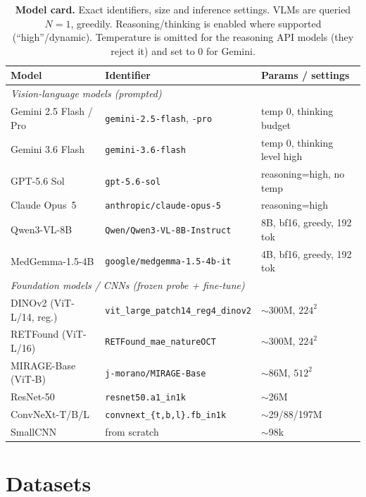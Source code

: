 \begin{table}[t]
  \centering
  \caption{\textbf{Model card.} Exact identifiers, size and inference settings. VLMs are queried $N{=}1$,
  greedily. Reasoning/thinking is enabled where supported (``high''/dynamic). Temperature is omitted for the
  reasoning API models (they reject it) and set to 0 for Gemini.}
  \label{tab:models}
  \small
  \renewcommand{\arraystretch}{0.9}
  \setlength{\tabcolsep}{4pt}
  \begin{tabular}{lll}
    \toprule
    Model & Identifier & Params / settings \\
    \midrule
    \multicolumn{3}{l}{\textit{Vision-language models (prompted)}} \\
    \midrule
    Gemini 2.5 Flash / Pro & \texttt{gemini-2.5-flash}, \texttt{-pro} & temp 0, thinking budget \\
    Gemini 3.6 Flash & \texttt{gemini-3.6-flash} & temp 0, thinking level high \\
    GPT-5.6 Sol & \texttt{gpt-5.6-sol} & reasoning=high, no temp \\
    Claude Opus~5 & \texttt{anthropic/claude-opus-5} & reasoning=high \\
    Qwen3-VL-8B & \texttt{Qwen/Qwen3-VL-8B-Instruct} & 8B, bf16, greedy, 192 tok \\
    MedGemma-1.5-4B & \texttt{google/medgemma-1.5-4b-it} & 4B, bf16, greedy, 192 tok \\
    \midrule
    \multicolumn{3}{l}{\textit{Foundation models / CNNs (frozen probe + fine-tune)}} \\
    \midrule
    DINOv2 (ViT-L/14, reg.) & \texttt{vit\_large\_patch14\_reg4\_dinov2} & $\sim$300M, $224^2$ \\
    RETFound (ViT-L/16) & \texttt{RETFound\_mae\_natureOCT} & $\sim$300M, $224^2$ \\
    MIRAGE-Base (ViT-B) & \texttt{j-morano/MIRAGE-Base} & $\sim$86M, $512^2$ \\
    ResNet-50 & \texttt{resnet50.a1\_in1k} & $\sim$26M \\
    ConvNeXt-T/B/L & \texttt{convnext\_\{t,b,l\}.fb\_in1k} & $\sim$29/88/197M \\
    SmallCNN & from scratch & $\sim$98k \\
    \bottomrule
  \end{tabular}
\end{table}

\section{Datasets}
\label{app:datasets}

